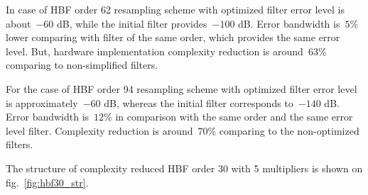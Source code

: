\documentclass[conference]{IEEEtran}
\begin{document}
In case of HBF order 62 resampling scheme with optimized filter error level is about~$-60$ dB, while the initial filter provides~$-100$ dB. Error bandwidth is~$5\%$ lower comparing with filter of the same order, which provides the same error level. But, hardware implementation complexity reduction is around~$63\%$ comparing to non-simplified filters.

For the case of HBF order 94 resampling scheme with optimized filter error level is approximately~$-60$ dB, whereas the initial filter corresponds to~$-140$ dB. Error bandwidth is~$12\%$ in comparison with the same order and the same error level filter. Complexity reduction is around~$70\%$ comparing to the non-optimized filters.

The structure of complexity reduced HBF order 30 with 5 multipliers is shown on fig.~\ref{fig:hbf30_str}.
\end{document}
